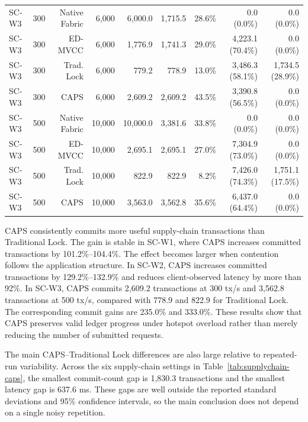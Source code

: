 \documentclass[fleqn,10pt,lineno]{wlpeerj}
\begin{document}
\begin{table}[ht]
{\begin{tabular}{@{}llrrrrrrr@{}}
\addlinespace
SC-W3 & 300 & Native Fabric & 6,000 & 6,000.0 & 1,715.5 & 28.6\% & 0.0 (0.0\%) & 0.0 (0.0\%) \\
SC-W3 & 300 & ED-MVCC & 6,000 & 1,776.9 & 1,741.3 & 29.0\% & 4,223.1 (70.4\%) & 0.0 (0.0\%) \\
SC-W3 & 300 & Trad. Lock & 6,000 & 779.2 & 778.9 & 13.0\% & 3,486.3 (58.1\%) & 1,734.5 (28.9\%) \\
SC-W3 & 300 & CAPS & 6,000 & 2,609.2 & 2,609.2 & 43.5\% & 3,390.8 (56.5\%) & 0.0 (0.0\%) \\
\addlinespace
SC-W3 & 500 & Native Fabric & 10,000 & 10,000.0 & 3,381.6 & 33.8\% & 0.0 (0.0\%) & 0.0 (0.0\%) \\
SC-W3 & 500 & ED-MVCC & 10,000 & 2,695.1 & 2,695.1 & 27.0\% & 7,304.9 (73.0\%) & 0.0 (0.0\%) \\
SC-W3 & 500 & Trad. Lock & 10,000 & 822.9 & 822.9 & 8.2\% & 7,426.0 (74.3\%) & 1,751.1 (17.5\%) \\
SC-W3 & 500 & CAPS & 10,000 & 3,563.0 & 3,562.8 & 35.6\% & 6,437.0 (64.4\%) & 0.0 (0.0\%) \\
\bottomrule
\end{tabular}}
\end{table}

CAPS consistently commits more useful supply-chain transactions than Traditional Lock. The gain is stable in SC-W1, where CAPS increases committed transactions by 101.2\%--104.4\%. The effect becomes larger when contention follows the application structure. In SC-W2, CAPS increases committed transactions by 129.2\%--132.9\% and reduces client-observed latency by more than 92\%. In SC-W3, CAPS commits 2,609.2 transactions at 300 tx/s and 3,562.8 transactions at 500 tx/s, compared with 778.9 and 822.9 for Traditional Lock. The corresponding commit gains are 235.0\% and 333.0\%. These results show that CAPS preserves valid ledger progress under hotspot overload rather than merely reducing the number of submitted requests.

The main CAPS--Traditional Lock differences are also large relative to repeated-run variability. Across the six supply-chain settings in Table~\ref{tab:supplychain-caps}, the smallest commit-count gap is 1,830.3 transactions and the smallest latency gap is 637.6 ms. These gaps are well outside the reported standard deviations and 95\% confidence intervals, so the main conclusion does not depend on a single noisy repetition.
\end{document}
